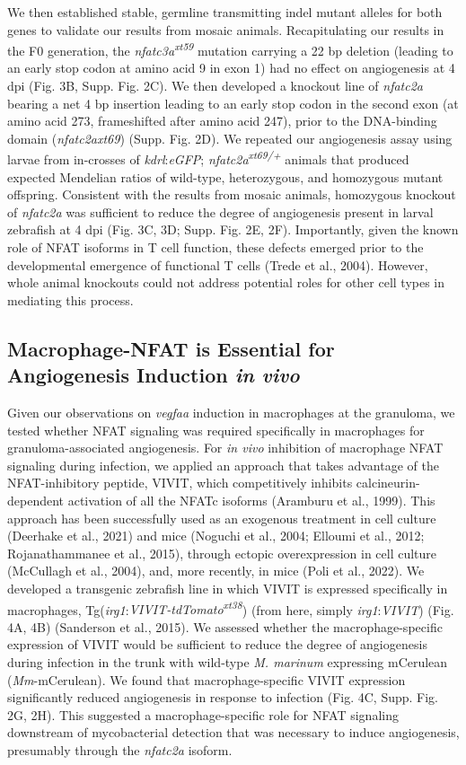 We then established stable, germline transmitting indel mutant alleles for both genes to validate our results from mosaic animals. Recapitulating our results in the F0 generation, the \textit{nfatc3a\textsuperscript{xt59}} mutation carrying a 22 bp deletion (leading to an early stop codon at amino acid 9 in exon 1) had no effect on angiogenesis at 4 dpi (Fig. 3B, Supp. Fig. 2C). We then developed a knockout line of \textit{nfatc2a} bearing a net 4 bp insertion leading to an early stop codon in the second exon (at amino acid 273, frameshifted after amino acid 247), prior to the DNA-binding domain (\textit{nfatc2a\textit{xt69}}) (Supp. Fig. 2D). We repeated our angiogenesis assay using larvae from in-crosses of \textit{kdrl}:\textit{eGFP}; \textit{nfatc2a\textsuperscript{xt69/+}} animals that produced expected Mendelian ratios of wild-type, heterozygous, and homozygous mutant offspring. Consistent with the results from mosaic animals, homozygous knockout of \textit{nfatc2a} was sufficient to reduce the degree of angiogenesis present in larval zebrafish at 4 dpi (Fig. 3C, 3D; Supp. Fig. 2E, 2F). Importantly, given the known role of NFAT isoforms in T cell function, these defects emerged prior to the developmental emergence of functional T cells (Trede et al., 2004). However, whole animal knockouts could not address potential roles for other cell types in mediating this process. 

\subsection{Macrophage-NFAT is Essential for Angiogenesis Induction \textit{in vivo}}

Given our observations on \textit{vegfaa} induction in macrophages at the granuloma, we tested whether NFAT signaling was required specifically in macrophages for granuloma-associated angiogenesis. For \textit{in vivo} inhibition of macrophage NFAT signaling during infection, we applied an approach that takes advantage of the NFAT-inhibitory peptide, VIVIT, which competitively inhibits calcineurin-dependent activation of all the NFATc isoforms (Aramburu et al., 1999). This approach has been successfully used as an exogenous treatment in cell culture (Deerhake et al., 2021) and mice (Noguchi et al., 2004; Elloumi et al., 2012; Rojanathammanee et al., 2015), through ectopic overexpression in cell culture (McCullagh et al., 2004),  and, more recently, in mice (Poli et al., 2022). We developed a transgenic zebrafish line in which VIVIT is expressed specifically in macrophages, Tg(\textit{irg1}:\textit{VIVIT-tdTomato\textsuperscript{xt38}}) (from here, simply \textit{irg1}:\textit{VIVIT}) (Fig. 4A, 4B) (Sanderson et al., 2015). We assessed whether the macrophage-specific expression of VIVIT would be sufficient to reduce the degree of angiogenesis during infection in the trunk with wild-type \textit{M. marinum} expressing mCerulean (\textit{Mm}-mCerulean). We found that macrophage-specific VIVIT expression significantly reduced angiogenesis in response to infection (Fig. 4C, Supp. Fig. 2G, 2H). This suggested a macrophage-specific role for NFAT signaling downstream of mycobacterial detection that was necessary to induce angiogenesis, presumably through the \textit{nfatc2a} isoform.


